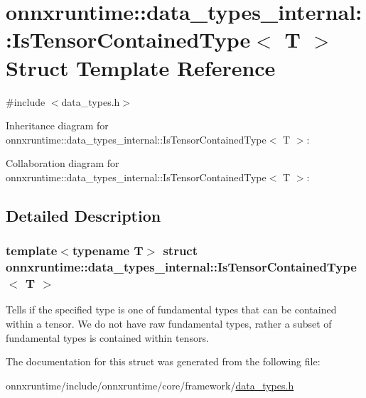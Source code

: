 \hypertarget{structonnxruntime_1_1data__types__internal_1_1IsTensorContainedType}{}\section{onnxruntime\+:\+:data\+\_\+types\+\_\+internal\+:\+:Is\+Tensor\+Contained\+Type$<$ T $>$ Struct Template Reference}
\label{structonnxruntime_1_1data__types__internal_1_1IsTensorContainedType}


{\ttfamily \#include $<$data\+\_\+types.\+h$>$}



Inheritance diagram for onnxruntime\+:\+:data\+\_\+types\+\_\+internal\+:\+:Is\+Tensor\+Contained\+Type$<$ T $>$\+:


Collaboration diagram for onnxruntime\+:\+:data\+\_\+types\+\_\+internal\+:\+:Is\+Tensor\+Contained\+Type$<$ T $>$\+:


\subsection{Detailed Description}
\subsubsection*{template$<$typename T$>$\newline
struct onnxruntime\+::data\+\_\+types\+\_\+internal\+::\+Is\+Tensor\+Contained\+Type$<$ T $>$}

Tells if the specified type is one of fundamental types that can be contained within a tensor. We do not have raw fundamental types, rather a subset of fundamental types is contained within tensors. 

The documentation for this struct was generated from the following file\+:\begin{DoxyCompactItemize}
\item 
onnxruntime/include/onnxruntime/core/framework/\mbox{\hyperlink{data__types_8h}{data\+\_\+types.\+h}}\end{DoxyCompactItemize}
